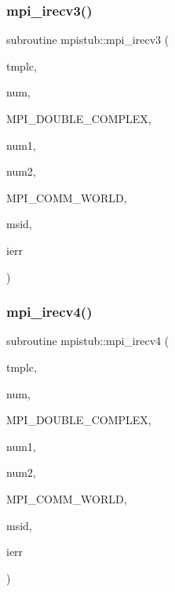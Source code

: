 \subsubsection{\texorpdfstring{mpi\_irecv3()}{mpi\_irecv3()}}
{\footnotesize\ttfamily subroutine mpistub\+::mpi\+\_\+irecv3 (\begin{DoxyParamCaption}\item[{double complex, dimension(\+:,\+:)}]{tmplc,  }\item[{}]{num,  }\item[{}]{M\+P\+I\+\_\+\+D\+O\+U\+B\+L\+E\+\_\+\+C\+O\+M\+P\+L\+EX,  }\item[{}]{num1,  }\item[{}]{num2,  }\item[{}]{M\+P\+I\+\_\+\+C\+O\+M\+M\+\_\+\+W\+O\+R\+LD,  }\item[{}]{msid,  }\item[{}]{ierr }\end{DoxyParamCaption})}

\mbox{\label{namespacempistub_a99d8cacbf221fe5a3829f6dbc22159a6}} 
\subsubsection{\texorpdfstring{mpi\_irecv4()}{mpi\_irecv4()}}
{\footnotesize\ttfamily subroutine mpistub\+::mpi\+\_\+irecv4 (\begin{DoxyParamCaption}\item[{double complex, dimension(\+:,\+:,\+:)}]{tmplc,  }\item[{}]{num,  }\item[{}]{M\+P\+I\+\_\+\+D\+O\+U\+B\+L\+E\+\_\+\+C\+O\+M\+P\+L\+EX,  }\item[{}]{num1,  }\item[{}]{num2,  }\item[{}]{M\+P\+I\+\_\+\+C\+O\+M\+M\+\_\+\+W\+O\+R\+LD,  }\item[{}]{msid,  }\item[{}]{ierr }\end{DoxyParamCaption})}

\mbox{\label{namespacempistub_a42635e07cedd999352dec8ee45a378f5}} 
